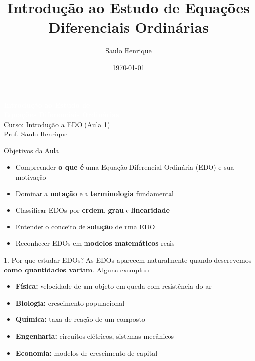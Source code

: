\documentclass[11pt, aspectratio=169]{beamer}
\title{Introdução ao Estudo de Equações Diferenciais Ordinárias}
\author{Saulo Henrique}
\date{\today}
\begin{document}
\begin{frame}[plain]
  \begin{center}
    \vspace{1.2cm}
    {\Huge \textbf{\textcolor{white}{Introdução ao Estudo de}}}\\[4pt]
    {\Huge \textbf{\textcolor{white}{Equações Diferenciais Ordinárias}}}\\[16pt]
    {\large \textcolor{gray!80}{Curso: Introdução a EDO (Aula 1)}}\\[6pt]
    {\normalsize \textcolor{accent}{Prof. Saulo Henrique}}
  \end{center}
\end{frame}

\begin{frame}{Objetivos da Aula}
\begin{itemize}
  \item Compreender \textbf{o que é} uma Equação Diferencial Ordinária (EDO) e sua motivação
  \item Dominar a \textbf{notação} e a \textbf{terminologia} fundamental
  \item Classificar EDOs por \textbf{ordem}, \textbf{grau} e \textbf{linearidade}
  \item Entender o conceito de \textbf{solução} de uma EDO
  \item Reconhecer EDOs em \textbf{modelos matemáticos} reais
\end{itemize}
\end{frame}

\begin{frame}{1. Por que estudar EDOs?}
As EDOs aparecem naturalmente quando descrevemos \textbf{como quantidades variam}. Alguns exemplos:
\begin{itemize}
  \item \textbf{Física:} velocidade de um objeto em queda com resistência do ar
  \item \textbf{Biologia:} crescimento populacional
  \item \textbf{Química:} taxa de reação de um composto
  \item \textbf{Engenharia:} circuitos elétricos, sistemas mecânicos
  \item \textbf{Economia:} modelos de crescimento de capital
\end{itemize}
\end{frame}
\end{document}

